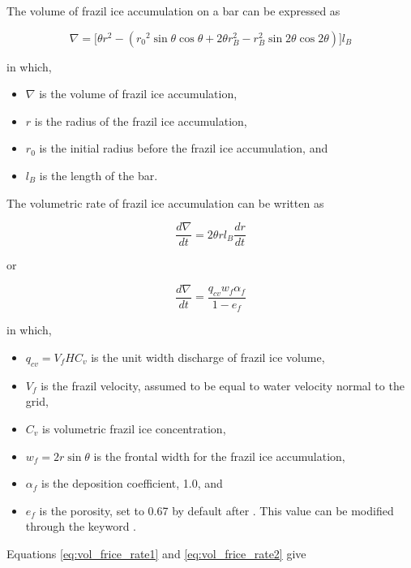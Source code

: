 The volume of frazil ice accumulation on a bar can be expressed as

\begin{equation} \label{eq:vol_frice_acc}
\nabla = \big[\theta r^2 - ({r_0}^2\sin\theta \cos\theta + 2\theta r_B^2 - r_B^2 \sin 2\theta \cos 2\theta)\big]l_B
\end{equation}

in which,
\begin{itemize}
    \item $\nabla$ is the volume of frazil ice accumulation,
    \item $r$ is the radius of the frazil ice accumulation,
    \item $r_0$ is the initial radius before the frazil ice accumulation, and
    \item $l_B$ is the length of the bar.
\end{itemize}

The volumetric rate of frazil ice accumulation can be written as

\begin{equation} \label{eq:vol_frice_rate1}
\dfrac{d\nabla}{dt} = 2\theta rl_B \frac{dr}{dt}
\end{equation}

or

\begin{equation} \label{eq:vol_frice_rate2}
  \dfrac{d\nabla}{dt} = \dfrac{q_{cv}w_f \alpha_f}{1-e_f}
\end{equation}

in which,
\begin{itemize}
    \item $q_{cv} = V_fHC_v$ is the unit width discharge of frazil ice volume,
    \item $V_f$ is the frazil velocity, assumed to be equal to water velocity normal to the grid,
    \item $C_v$ is volumetric frazil ice concentration,
    \item $w_f=2r\sin\theta$ is the frontal width for the frazil ice accumulation,
    \item $\alpha_f$ is the deposition coefficient, 1.0, and
    \item $e_f$ is the porosity, set to 0.67 by default after \cite{andersson1992laboratory}. This value can be modified through the keyword .
\end{itemize}

Equations \eqref{eq:vol_frice_rate1} and \eqref{eq:vol_frice_rate2} give

